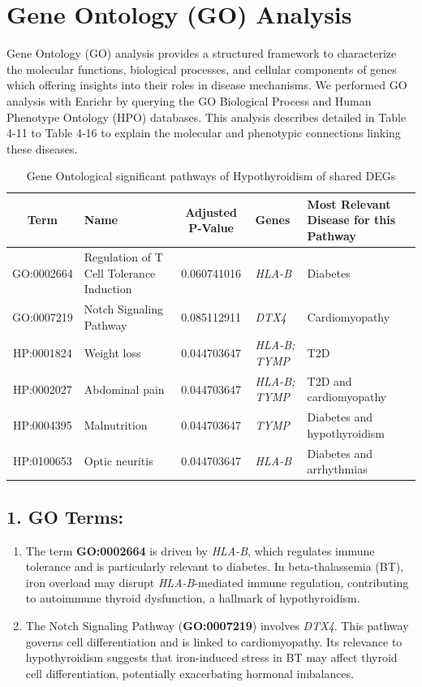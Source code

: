 \section{Gene Ontology (GO) Analysis}
\label{sec:sec4_5}
Gene Ontology (GO) analysis provides a structured framework to characterize the molecular functions, biological processes, and cellular components of genes which offering insights into their roles in disease mechanisms. We performed GO analysis with Enrichr by querying the GO Biological Process and Human Phenotype Ontology (HPO) databases. This analysis describes detailed in Table 4-11 to Table 4-16 to explain the molecular and phenotypic connections linking these diseases.

\begin{table}[H]
\centering
\caption{Gene Ontological significant pathways of Hypothyroidism of shared DEGs}
\label{tab:Hypothyroidism_GO}
\renewcommand{\arraystretch}{1.2} %
\small
\begin{tabularx}{\textwidth}{|c|X|c|X|X|}
\hline
\textbf{Term} & \textbf{Name} & \textbf{Adjusted P-Value} & \textbf{Genes} & \textbf{Most Relevant Disease for this Pathway} \\
\hline
GO:0002664 & Regulation of T Cell Tolerance Induction & 0.060741016 & \textit{HLA-B} & Diabetes \\
\hline
GO:0007219 & Notch Signaling Pathway & 0.085112911 & \textit{DTX4} & Cardiomyopathy \\
\hline
HP:0001824 & Weight loss & 0.044703647 & \textit{HLA-B; TYMP} & T2D \\
\hline
HP:0002027 & Abdominal pain & 0.044703647 & \textit{HLA-B; TYMP} & T2D and cardiomyopathy \\
\hline
HP:0004395 & Malnutrition & 0.044703647 & \textit{TYMP} & Diabetes and hypothyroidism \\
\hline
HP:0100653 & Optic neuritis & 0.044703647 & \textit{HLA-B} & Diabetes and arrhythmias \\
\hline
\end{tabularx}
\end{table}

\subsection*{1. GO Terms: }
\begin{enumerate}
    \item The term \textbf{GO:0002664} is driven by \textit{HLA-B}, which regulates immune tolerance and is particularly relevant to diabetes. In beta-thalassemia (BT), iron overload may disrupt \textit{HLA-B}-mediated immune regulation, contributing to autoimmune thyroid dysfunction, a hallmark of hypothyroidism.
    
    \item The Notch Signaling Pathway (\textbf{GO:0007219}) involves \textit{DTX4}. This pathway governs cell differentiation and is linked to cardiomyopathy. Its relevance to hypothyroidism suggests that iron-induced stress in BT may affect thyroid cell differentiation, potentially exacerbating hormonal imbalances.
\end{enumerate}

